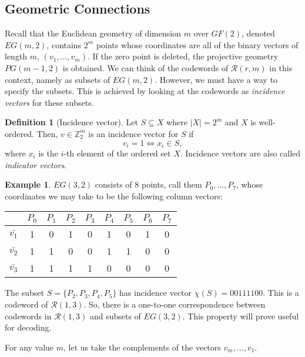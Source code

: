 \documentclass[12pt,twoside]{reedthesis}
\theoremstyle{definition}
\newtheorem{definition}[theorem]{Definition}
\newtheorem{example}[theorem]{Example}
\newcommand{\Z}{\mathbb{Z}}
\begin{document}
\subsection{Geometric Connections}
Recall that the Euclidean geometry of dimension $m$ over $GF(2)$, denoted $EG(m,2)$, contains $2^m$ points whose coordinates are all of the binary vectors of length $m$, $(v_1, \ldots, v_m)$. If the zero point is deleted, the projective geometry $PG(m-1, 2)$ is obtained. We can think of the codewords of $\mathscr{R}(r,m)$ in this context, namely as subsets of $EG(m,2)$. However, we must have a way to specify the subsets. This is achieved by looking at the codewords as \textit{incidence vectors} for these subsets.

\begin{definition}[Incidence vector] Let $S \subseteq X$ where $\lvert X \rvert = 2^m$ and $X$ is well-ordered. Then, $v \in \Z_2^m$ is an incidence vector for $S$ if
\begin{equation*}
v_i = 1 \iff x_i \in S,
\end{equation*}
where $x_i$ is the $i$-th element of the ordered set $X$. Incidence vectors are also called \textit{indicator vectors}.
\end{definition}

\begin{example}
$EG(3,2)$ consists of 8 points, call them $P_0, \ldots, P_7$, whose coordinates we may take to be the following column vectors:
\begin{center}
\begin{tabular}{ c | c c c c c c c c }
 & $P_0$ & $P_1$ & $P_2$ &$ P_3$ &$ P_4$ &$ P_5 $& $P_6$ & $P_7$ \\
 \hline
$\bar{v_1}$ & 1 & 0 & 1 & 0 & 1 & 0 & 1 & 0\\
$\bar{v_2}$ & 1 & 1 & 0 & 0 & 1 & 1 & 0 & 0\\
$\bar{v_3}$ & 1 & 1 & 1 & 1 & 0 & 0 & 0 & 0\\   
\end{tabular}
\end{center}

The subset $S = \{P_2, P_3, P_4, P_5\}$ has incidence vector $\chi(S) = 00111100$. This is a codeword of $\mathscr{R}(1,3)$. So, there is a one-to-one correspondence between codewords in $\mathscr{R}(1,3)$ and subsets of $EG(3,2)$. This property will prove useful for decoding.
\end{example}

For any value $m$, let us take the complements of the vectors $v_m, \ldots, v_1$.
\end{document}
